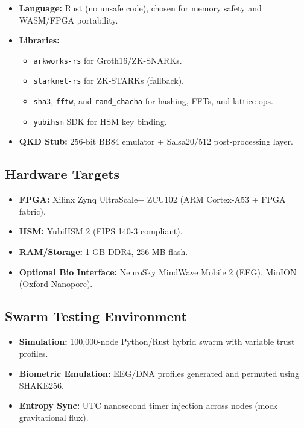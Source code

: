 \documentclass[12pt]{article}
\begin{document}
\begin{itemize}
    \item \textbf{Language:} Rust (no unsafe code), chosen for memory safety and WASM/FPGA portability.
    \item \textbf{Libraries:}
    \begin{itemize}
        \item \texttt{arkworks-rs} for Groth16/ZK-SNARKs.
        \item \texttt{starknet-rs} for ZK-STARKs (fallback).
        \item \texttt{sha3}, \texttt{fftw}, and \texttt{rand\_chacha} for hashing, FFTs, and lattice ops.
        \item \texttt{yubihsm} SDK for HSM key binding.
    \end{itemize}
    \item \textbf{QKD Stub:} 256-bit BB84 emulator + Salsa20/512 post-processing layer.
\end{itemize}

\subsection*{Hardware Targets}

\begin{itemize}
    \item \textbf{FPGA:} Xilinx Zynq UltraScale+ ZCU102 (ARM Cortex-A53 + FPGA fabric).
    \item \textbf{HSM:} YubiHSM 2 (FIPS 140-3 compliant).
    \item \textbf{RAM/Storage:} 1 GB DDR4, 256 MB flash.
    \item \textbf{Optional Bio Interface:} NeuroSky MindWave Mobile 2 (EEG), MinION (Oxford Nanopore).
\end{itemize}

\subsection*{Swarm Testing Environment}

\begin{itemize}
    \item \textbf{Simulation:} 100,000-node Python/Rust hybrid swarm with variable trust profiles.
    \item \textbf{Biometric Emulation:} EEG/DNA profiles generated and permuted using SHAKE256.
    \item \textbf{Entropy Sync:} UTC nanosecond timer injection across nodes (mock gravitational flux).
\end{itemize}
\end{document}
